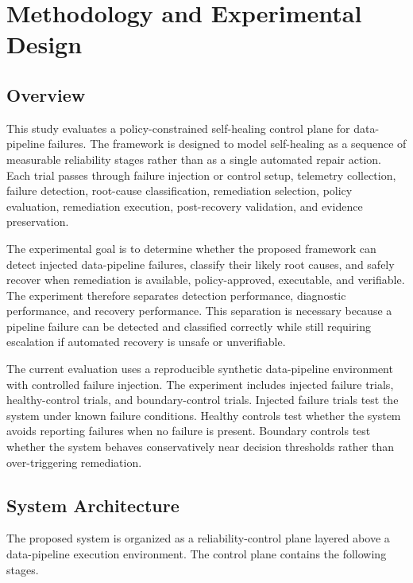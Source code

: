 \section{Methodology and Experimental Design}

\subsection{Overview}


This study evaluates a policy-constrained self-healing control plane for data-pipeline failures. The framework is designed to model self-healing as a sequence of measurable reliability stages rather than as a single automated repair action. Each trial passes through failure injection or control setup, telemetry collection, failure detection, root-cause classification, remediation selection, policy evaluation, remediation execution, post-recovery validation, and evidence preservation.

The experimental goal is to determine whether the proposed framework can detect injected data-pipeline failures, classify their likely root causes, and safely recover when remediation is available, policy-approved, executable, and verifiable. The experiment therefore separates detection performance, diagnostic performance, and recovery performance. This separation is necessary because a pipeline failure can be detected and classified correctly while still requiring escalation if automated recovery is unsafe or unverifiable.

The current evaluation uses a reproducible synthetic data-pipeline environment with controlled failure injection. The experiment includes injected failure trials, healthy-control trials, and boundary-control trials. Injected failure trials test the system under known failure conditions. Healthy controls test whether the system avoids reporting failures when no failure is present. Boundary controls test whether the system behaves conservatively near decision thresholds rather than over-triggering remediation.

\subsection{System Architecture}


The proposed system is organized as a reliability-control plane layered above a data-pipeline execution environment. The control plane contains the following stages.

